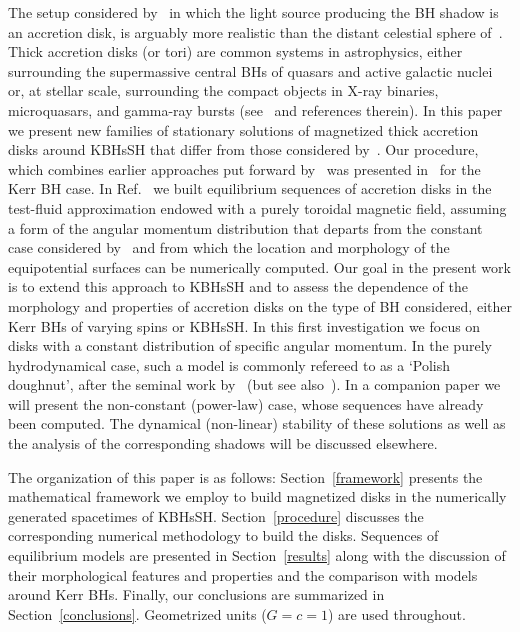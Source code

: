 \documentclass[twocolumn,aps,showpacs,showkeys,prd,superscriptaddress,byrevtex, amsmath]{revtex4-1}
\begin{document}
The setup considered by~\cite{Vincent:2016} in which the light source producing the BH shadow is an accretion disk, is arguably more realistic than the distant celestial sphere of~\cite{Cunha:2015}. Thick accretion disks (or tori) are common systems in astrophysics, either surrounding the supermassive central BHs of quasars and active galactic nuclei or, at  stellar scale, surrounding the compact objects in X-ray binaries, microquasars, and gamma-ray bursts (see~\cite{Abramowicz:2013} and references therein). In this paper we present new families of stationary solutions of magnetized thick accretion disks around KBHsSH that differ from those considered by~\cite{Vincent:2016}. Our procedure, which combines earlier approaches put forward by~\cite{Komissarov:2006,Qian:2009} was presented in~\cite{Gimeno-Soler:2017} for the Kerr BH case. In Ref.~\cite{Gimeno-Soler:2017} we built equilibrium sequences of accretion disks  in the test-fluid approximation endowed with a purely toroidal magnetic field, assuming a form of the angular momentum distribution that departs from the constant case considered by~\cite{Komissarov:2006} and from which the location and morphology of the equipotential surfaces can be numerically computed. Our goal in the present work is to extend this approach to KBHsSH and to assess the dependence of the morphology and properties of accretion disks on the type of BH considered, either Kerr BHs of varying spins or KBHsSH. In this first investigation we focus on disks with a constant distribution of specific angular momentum. In the  purely hydrodynamical case, such a model is commonly refereed to as a `Polish doughnut', after the seminal work by~\cite{Abramowicz:1978} (but see also~\cite{Fishbone:1976}). In a companion paper we will present the non-constant (power-law) case, whose sequences have already been computed. The dynamical (non-linear) stability of these solutions as well as the analysis of the corresponding shadows will be discussed elsewhere.

The organization of this paper is as follows: Section~\ref{framework} presents  the mathematical framework we employ to build magnetized disks in the numerically generated spacetimes of KBHsSH. Section~\ref{procedure} discusses the corresponding numerical methodology to build the disks. Sequences of equilibrium models are presented in Section~\ref{results} along with the discussion of their morphological features and properties and the comparison with models around Kerr BHs. Finally, our conclusions  are  summarized  in  Section~\ref{conclusions}. Geometrized units ($G=c=1$) are used throughout. 
 
\end{document}
